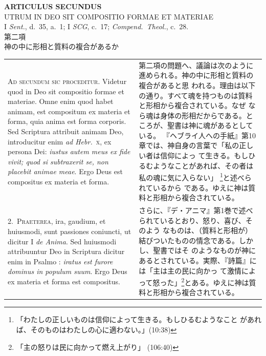 \documentclass[paper=a4paper,fontsize=10pt,jafontsize=9pt,titlepage]{jlreq}
\begin{document}
\newpage
{}

\begin{center}
 {\Large {\bfseries ARTICULUS SECUNDUS}}\\
 {\large UTRUM IN DEO SIT COMPOSITIO FORMAE ET MATERIAE}\\
 {\footnotesize I \textit{Sent.}, d.~35, a.~1; I \textit{SCG}, c.~17;
 \textit{Compend.~Theol.}, c.~28.}\\
 {\Large 第二項\\神の中に形相と質料の複合があるか}
\end{center}

\begin{longtable}{p{21em}p{21em}}

{\huge A}{\scshape d secundum sic proceditur}. Videtur quod in Deo sit
compositio formae et materiae. Omne enim quod habet animam, est
compositum ex materia et forma, quia anima est forma corporis. Sed
Scriptura attribuit animam Deo, introducitur enim \textit{ad
Hebr.}~\textsc{x}, ex persona Dei: \textit{iustus autem meus ex fide
vivit; quod si subtraxerit se, non placebit animae meae}. Ergo Deus est
compositus ex materia et forma.


& 

第二項の問題へ、議論は次のように進められる。神の中に形相と質料の複合があると思
われる。理由は以下の通り。すべて魂を持つものは質料と形相から複合されている。なぜ
なら魂は身体の形相だからである。ところが、聖書は神に魂があるとしている。
『ヘブライ人への手紙』第10章では、神自身の言葉で「私の正しい者は信仰によっ
て生きる。もしひるむようなことがあれば、その者は私の魂に気に入らない」
\footnote{「わたしの正しいものは信仰によって生きる。もしひるむようなこと
があれば、そのものはわたしの心に適わない。」(10:38)}と述べられているから
である。ゆえに神は質料と形相から複合されている。


\\


2.~\textsc{Praeterea}, ira, gaudium, et huiusmodi, sunt passiones
 coniuncti, ut dicitur I \textit{de Anima}. Sed huiusmodi attribuuntur Deo in
 Scriptura dicitur enim in Psalmo : \textit{iratus est furore dominus in populum
 suum}. Ergo Deus ex materia et forma est compositus.

& さらに、『デ・アニマ』第1巻で述べられているとおり、怒り、喜び、そのよう
なものは、（質料と形相が）結びついたものの情念である。しかし、聖書ではそ
のようなものが神にあるとされている。実際、『詩篇』には「主は主の民に向かっ
て激情によって怒った」\footnote{「主の怒りは民に向かって燃え上がり」
(106:40)}とある。ゆえに神は質料と形相から複合されている。


\end{longtable}
\end{document}
